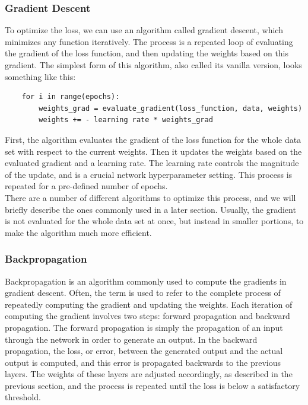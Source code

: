 \subsubsection{Gradient Descent}

\noindent To optimize the loss, we can use an algorithm called gradient descent, which minimizes any function iteratively. The process is a repeated loop of evaluating the gradient of the loss function, and then updating the weights based on this gradient. The simplest form of this algorithm, also called its vanilla version, looks something like this:

\begin{lstlisting}
    for i in range(epochs):
        weights_grad = evaluate_gradient(loss_function, data, weights)
        weights += - learning rate * weights_grad
\end{lstlisting}

\noindent First, the algorithm evaluates the gradient of the loss function for the whole data set with respect to the current weights. Then it updates the weights based on the evaluated gradient and a learning rate. The learning rate controls the magnitude of the update, and is a crucial network hyperparameter setting. This process is repeated for a pre-defined number of epochs. \\

\noindent There are a number of different algorithms to optimize this process, and we will briefly describe the ones commonly used in a later section. Usually, the gradient is not evaluated for the whole data set at once, but instead in smaller portions, to make the algorithm much more efficient.

\subsubsection{Backpropagation}

\noindent Backpropagation is an algorithm commonly used to compute the gradients in gradient descent. Often, the term is used to refer to the complete process of repeatedly computing the gradient and updating the weights. Each iteration of computing the gradient involves two steps: forward propagation and backward propagation. The forward propagation is simply the propagation of an input through the network in order to generate an output. In the backward propagation, the loss, or error, between the generated output and the actual output is computed, and this error is propagated backwards to the previous layers. The weights of these layers are adjusted accordingly, as described in the previous section, and the process is repeated until the loss is below a satisfactory threshold.

